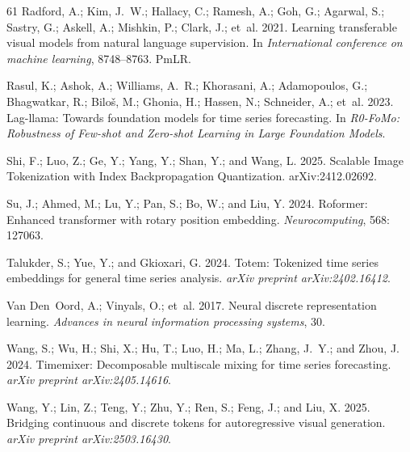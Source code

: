 \documentclass[letterpaper]{article} %
\begin{document}
\begin{thebibliography}{61}
Radford, A.; Kim, J.~W.; Hallacy, C.; Ramesh, A.; Goh, G.; Agarwal, S.; Sastry,
  G.; Askell, A.; Mishkin, P.; Clark, J.; et~al. 2021.
\newblock Learning transferable visual models from natural language
  supervision.
\newblock In \emph{International conference on machine learning}, 8748--8763.
  PmLR.

Rasul, K.; Ashok, A.; Williams, A.~R.; Khorasani, A.; Adamopoulos, G.;
  Bhagwatkar, R.; Bilo{\v{s}}, M.; Ghonia, H.; Hassen, N.; Schneider, A.;
  et~al. 2023.
\newblock Lag-llama: Towards foundation models for time series forecasting.
\newblock In \emph{R0-FoMo: Robustness of Few-shot and Zero-shot Learning in
  Large Foundation Models}.

Shi, F.; Luo, Z.; Ge, Y.; Yang, Y.; Shan, Y.; and Wang, L. 2025.
\newblock Scalable Image Tokenization with Index Backpropagation Quantization.
\newblock arXiv:2412.02692.

Su, J.; Ahmed, M.; Lu, Y.; Pan, S.; Bo, W.; and Liu, Y. 2024.
\newblock Roformer: Enhanced transformer with rotary position embedding.
\newblock \emph{Neurocomputing}, 568: 127063.

Talukder, S.; Yue, Y.; and Gkioxari, G. 2024.
\newblock Totem: Tokenized time series embeddings for general time series
  analysis.
\newblock \emph{arXiv preprint arXiv:2402.16412}.

Van Den~Oord, A.; Vinyals, O.; et~al. 2017.
\newblock Neural discrete representation learning.
\newblock \emph{Advances in neural information processing systems}, 30.

Wang, S.; Wu, H.; Shi, X.; Hu, T.; Luo, H.; Ma, L.; Zhang, J.~Y.; and Zhou, J.
  2024{}.
\newblock Timemixer: Decomposable multiscale mixing for time series
  forecasting.
\newblock \emph{arXiv preprint arXiv:2405.14616}.

Wang, Y.; Lin, Z.; Teng, Y.; Zhu, Y.; Ren, S.; Feng, J.; and Liu, X. 2025.
\newblock Bridging continuous and discrete tokens for autoregressive visual
  generation.
\newblock \emph{arXiv preprint arXiv:2503.16430}.


\end{thebibliography}
\end{document}
